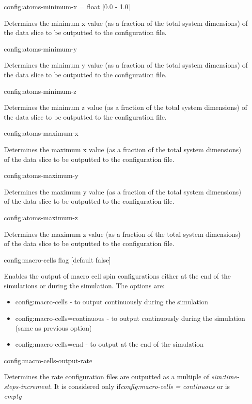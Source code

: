 {\zicf config:atoms-minimum-x = float [0.0 - 1.0]} Determines the minimum x value (as a fraction of the total system dimensions) of the data slice to be outputted to the configuration file.

{\zicf config:atoms-minimum-y} Determines the minimum y value (as a fraction of the total system dimensions) of the data slice to be outputted to the configuration file.

{\zicf config:atoms-minimum-z} Determines the minimum z value (as a fraction of the total system dimensions) of the data slice to be outputted to the configuration file.

{\zicf config:atoms-maximum-x} Determines the maximum x value (as a fraction of the total system dimensions) of the data slice to be outputted to the configuration file.

{\zicf config:atoms-maximum-y} Determines the maximum y value (as a fraction of the total system dimensions) of the data slice to be outputted to the configuration file.

{\zicf config:atoms-maximum-z} Determines the maximum z value (as a fraction of the total system dimensions) of the data slice to be outputted to the configuration file.

{\zicf config:macro-cells flag [default false]} Enables the output of macro cell spin configurations either at the end of the simulations or during the simulation. The options are:

\begin{itemize}
  \item[] config:macro-cells - to output continuously during the simulation
  \item[] config:macro-cells=continuous - to output continuously during the simulation (same as previous option)
  \item[] config:macro-cells=end - to output at the end of the simulation
\end{itemize}

{\zicf config:macro-cells-output-rate} Determines the rate configuration files are outputted as a multiple of \textit{sim:time-steps-increment}. It is considered only if\newline \textit{config:macro-cells = continuous} or is \textit{empty}

